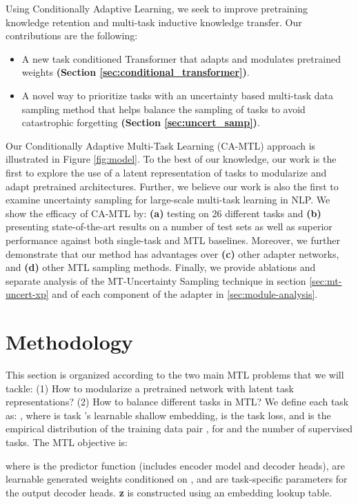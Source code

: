 \documentclass{article} \usepackage{iclr2021_conference,times}
\begin{document}
Using Conditionally Adaptive Learning, we seek to improve pretraining knowledge retention and multi-task inductive knowledge transfer. Our contributions are the following: 
\begin{itemize}[noitemsep,partopsep=0pt,topsep=0pt,parsep=0pt,leftmargin=4mm]
  \item A new task conditioned Transformer that adapts and modulates pretrained weights \textbf{(Section \ref{sec:conditional_transformer})}.
  \item A novel way to prioritize tasks with an uncertainty based multi-task data sampling method that helps balance the sampling of tasks to avoid catastrophic forgetting \textbf{(Section \ref{sec:uncert_samp})}.
\end{itemize}
Our Conditionally Adaptive Multi-Task Learning (CA-MTL) approach is illustrated in Figure \ref{fig:model}. To the best of our knowledge, our work is the first to explore the use of a latent representation of tasks to modularize and adapt pretrained architectures. Further, we believe our work is also the first to examine  uncertainty sampling for large-scale multi-task learning in NLP. We show the efficacy of CA-MTL by: \textbf{(a)} testing on 26 different tasks and \textbf{(b)} presenting state-of-the-art results on a number of test sets as well as superior performance against both single-task and MTL baselines. Moreover, we further demonstrate that our method has advantages over \textbf{(c)} other adapter networks, and \textbf{(d)} other MTL sampling methods. Finally, we provide ablations and separate analysis of the MT-Uncertainty Sampling technique in section \ref{sec:mt-uncert-xp} and of each component of the adapter in \ref{sec:module-analysis}.

\section{Methodology}
\label{sec:cond_param_share}

This section is organized according to the two main MTL problems that we will tackle: (1) How to modularize a pretrained network with latent task representations? (2) How to balance different tasks in MTL?
We define each task as:
, 
where  is task 's learnable shallow embedding,  is the task loss, and  is the empirical distribution of the training data pair , for  and  the number of supervised tasks.
The MTL objective is:

where  is the predictor function (includes encoder model and decoder heads),  are learnable generated weights conditioned on , and  are task-specific parameters for the output decoder heads. \textbf{z} is constructed using an embedding lookup table.
\end{document}
